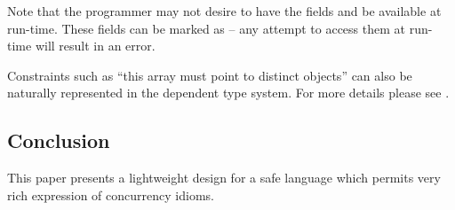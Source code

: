 Note that the programmer may not desire to have the fields 
and  be available at run-time. These fields can be marked
as  -- any attempt to access them at run-time will result
in an error. 

Constraints such as ``this array must point to distinct objects'' can
also be naturally represented in the dependent type system. For more
details please see \cite{effects-constrained-types}.

\subsection{Conclusion}

This paper presents a lightweight design for a safe language which
permits very rich expression of concurrency idioms. 


